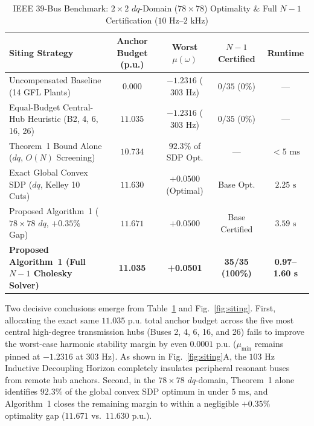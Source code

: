 \documentclass[10pt,twocolumn]{article}
\begin{document}
\begin{table}[t]
\centering
\caption{IEEE 39-Bus Benchmark: $2\times 2$ $dq$-Domain ($78\times 78$) Optimality \& Full $N-1$ Certification ($10\text{ Hz}$--$2\text{ kHz}$)}
\label{tab:benchmark}
\footnotesize
\begin{tabular}{@{}lcccc@{}}
\toprule
\textbf{Siting Strategy} & \textbf{Anchor Budget (p.u.)} & \textbf{Worst $\mu(\omega)$} & \textbf{$N-1$ Certified} & \textbf{Runtime} \\
\midrule
Uncompensated Baseline (14 GFL Plants) & $0.000$ & $-1.2316$ ($303\text{ Hz}$) & $0/35$ ($0\%$) & --- \\
Equal-Budget Central-Hub Heuristic (B2, 4, 6, 16, 26) & $11.035$ & $-1.2316$ ($303\text{ Hz}$) & $0/35$ ($0\%$) & --- \\
Theorem~1 Bound Alone ($dq$, $O(N)$ Screening) & $10.734$ & $92.3\%$ of SDP Opt. & --- & $<5\text{ ms}$ \\
Exact Global Convex SDP ($dq$, Kelley 10 Cuts) & $11.630$ & $+0.0500$ (Optimal) & Base Opt. & $2.25\text{ s}$ \\
Proposed Algorithm~1 ($78\times 78$ $dq$, $+0.35\%$ Gap) & $11.671$ & $+0.0500$ & Base Certified & $3.59\text{ s}$ \\
\textbf{Proposed Algorithm~1 (Full $N-1$ Cholesky Solver)} & \textbf{11.035} & \textbf{+0.0501} & \textbf{35/35 (100\%)} & \textbf{0.97--1.60 s} \\
\bottomrule
\end{tabular}
\end{table}

Two decisive conclusions emerge from Table~\ref{tab:benchmark} and Fig.~\ref{fig:siting}. First, allocating the exact same $11.035\text{ p.u.}$ total anchor budget across the five most central high-degree transmission hubs (Buses 2, 4, 6, 16, and 26) fails to improve the worst-case harmonic stability margin by even $0.0001\text{ p.u.}$ ($\mu_{\min}$ remains pinned at $-1.2316$ at $303\text{ Hz}$). As shown in Fig.~\ref{fig:siting}A, the $103\text{ Hz}$ Inductive Decoupling Horizon completely insulates peripheral resonant buses from remote hub anchors. Second, in the $78\times 78$ $dq$-domain, Theorem~1 alone identifies $92.3\%$ of the global convex SDP optimum in under $5\text{ ms}$, and Algorithm~1 closes the remaining margin to within a negligible $+0.35\%$ optimality gap ($11.671$ vs.\ $11.630\text{ p.u.}$).
\end{document}
